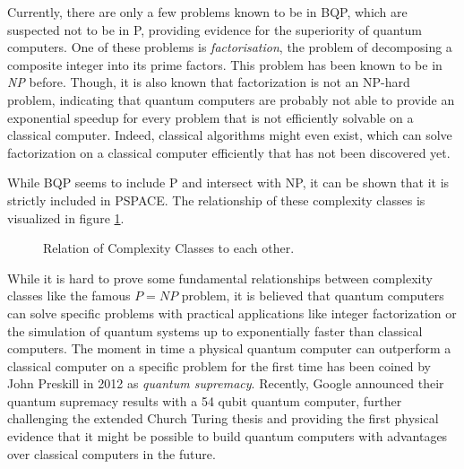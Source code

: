 Currently, there are only a few problems known to be in BQP, which are suspected not to be in P, providing evidence for the superiority of quantum computers. One
of these problems is \textit{factorisation}, the problem of decomposing a
composite integer into its prime factors. This problem has been known to be in
\textit{NP} before. Though, it is also known that factorization is not an NP-hard problem, indicating that quantum computers are probably not able to provide
an exponential speedup for every problem that is not efficiently solvable on a
classical computer. Indeed, classical algorithms might even exist, which can
solve factorization on a classical computer efficiently that has not been
discovered yet.

While BQP seems to include P and intersect with NP, it can be shown that it is strictly
included in PSPACE. The relationship of these complexity classes is visualized
in figure \ref{fig:complexityclasses}.

\begin{figure}[h]
  \centering
  \caption{Relation of Complexity Classes to each other.}
  \label{fig:complexityclasses}
\end{figure}

While it is hard to prove some fundamental relationships between complexity
classes like the famous $P = NP$ problem, it is believed that quantum computers
can solve specific problems with practical applications like integer factorization or the simulation of
quantum systems up to exponentially faster than classical computers. The moment
in time a physical quantum computer can outperform a classical computer
on a specific problem for the first time has been coined by John Preskill in
2012 as \textit{quantum supremacy}. Recently, Google announced their quantum
supremacy results with a 54 qubit quantum computer, further challenging the
extended Church Turing thesis and providing the first physical evidence that it
might be possible to build quantum computers with advantages over classical
computers in the future.